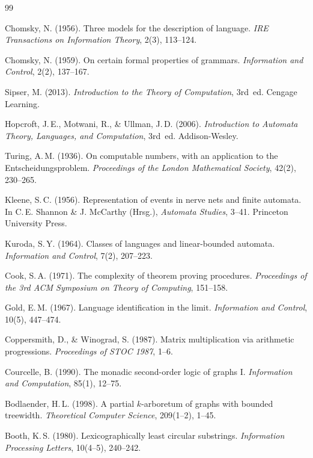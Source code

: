 ﻿\documentclass[a4paper,12pt]{article}
\theoremstyle{definition}
\begin{document}
\begin{thebibliography}{99}

Chomsky, N. (1956).
Three models for the description of language.
\textit{IRE Transactions on Information Theory}, 2(3), 113--124.

Chomsky, N. (1959).
On certain formal properties of grammars.
\textit{Information and Control}, 2(2), 137--167.

Sipser, M. (2013).
\textit{Introduction to the Theory of Computation}, 3rd~ed.
Cengage Learning.

Hopcroft, J.\,E., Motwani, R., \& Ullman, J.\,D. (2006).
\textit{Introduction to Automata Theory, Languages, and Computation}, 3rd~ed.
Addison-Wesley.

Turing, A.\,M. (1936).
On computable numbers, with an application to the Entscheidungsproblem.
\textit{Proceedings of the London Mathematical Society}, 42(2), 230--265.

Kleene, S.\,C. (1956).
Representation of events in nerve nets and finite automata.
In C.\,E. Shannon \& J. McCarthy (Hrsg.),
\textit{Automata Studies}, 3--41.
Princeton University Press.

Kuroda, S.\,Y. (1964).
Classes of languages and linear-bounded automata.
\textit{Information and Control}, 7(2), 207--223.

Cook, S.\,A. (1971).
The complexity of theorem proving procedures.
\textit{Proceedings of the 3rd ACM Symposium on Theory of Computing}, 151--158.

Gold, E.\,M. (1967).
Language identification in the limit.
\textit{Information and Control}, 10(5), 447--474.

Coppersmith, D., \& Winograd, S. (1987).
Matrix multiplication via arithmetic progressions.
\textit{Proceedings of STOC 1987}, 1--6.

Courcelle, B. (1990).
The monadic second-order logic of graphs I.
\textit{Information and Computation}, 85(1), 12--75.

Bodlaender, H.\,L. (1998).
A partial $k$-arboretum of graphs with bounded treewidth.
\textit{Theoretical Computer Science}, 209(1--2), 1--45.

Booth, K.\,S. (1980).
Lexicographically least circular substrings.
\textit{Information Processing Letters}, 10(4--5), 240--242.


\end{thebibliography}
\end{document}
